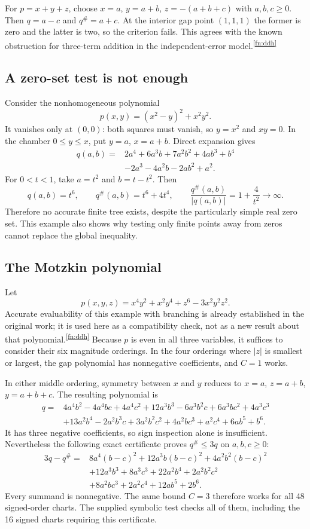 \documentclass[11pt,a4paper]{article}
\theoremstyle{definition}
\theoremstyle{remark}
\newcommand{\abs}[1]{\lvert #1\rvert}
\newcommand{\maj}[1]{#1^{\#}}
\newcommand{\src}[1]{\textsuperscript{\ref{fn:#1}}}
\begin{document}
For $p=x+y+z$, choose $x=a$, $y=a+b$, $z=-(a+b+c)$ with $a,b,c\ge0$.
Then $q=a-c$ and $\maj q=a+c$. At the interior gap point $(1,1,1)$ the former
is zero and the latter is two, so the criterion fails. This agrees with the
known obstruction for three-term addition in the independent-error
model.\src{ddh}

\subsection{A zero-set test is not enough}

Consider the nonhomogeneous polynomial
\[
 p(x,y)=(x^2-y)^2+x^2y^2.
\]
It vanishes only at $(0,0)$: both squares must vanish, so $y=x^2$ and $xy=0$.
In the chamber $0\le y\le x$, put $y=a$, $x=a+b$. Direct expansion gives
\begin{align*}
 q(a,b)={}&2a^4+6a^3b+7a^2b^2+4ab^3+b^4\\
          &-2a^3-4a^2b-2ab^2+a^2.
\end{align*}
For $0<t<1$, take $a=t^2$ and $b=t-t^2$. Then
\[
 q(a,b)=t^6,\qquad \maj q(a,b)=t^6+4t^4,
 \qquad\frac{\maj q(a,b)}{\abs{q(a,b)}}=1+\frac4{t^2}\longrightarrow\infty.
\]
Therefore no accurate finite tree exists, despite the particularly simple
real zero set. This example also shows why testing only finite points away
from zeros cannot replace the global inequality.

\subsection{The Motzkin polynomial}

Let
\[
 p(x,y,z)=x^4y^2+x^2y^4+z^6-3x^2y^2z^2.
\]
Accurate evaluability of this example with branching is already established
in the original work; it is used here as a compatibility check, not as a new
result about that polynomial.\src{ddh}
Because $p$ is even in all three variables, it suffices to consider their six
magnitude orderings. In the four orderings where $|z|$ is smallest or largest,
the gap polynomial has nonnegative coefficients, and $C=1$ works.

In either middle ordering, symmetry between $x$ and $y$ reduces to
$x=a$, $z=a+b$, $y=a+b+c$. The resulting polynomial is
\begin{align*}
 q={}&4a^4b^2-4a^4bc+4a^4c^2
       +12a^3b^3-6a^3b^2c+6a^3bc^2+4a^3c^3\\
     &+13a^2b^4-2a^2b^3c+3a^2b^2c^2+4a^2bc^3+a^2c^4
       +6ab^5+b^6.
\end{align*}
It has three negative coefficients, so sign inspection alone is insufficient.
Nevertheless the following exact certificate proves $\maj q\le3q$ on
$a,b,c\ge0$:
\begin{align*}
 3q-\maj q={}&8a^4(b-c)^2+12a^3b(b-c)^2+4a^2b^2(b-c)^2\\
 &+12a^3b^3+8a^3c^3+22a^2b^4+2a^2b^2c^2\\
 &+8a^2bc^3+2a^2c^4+12ab^5+2b^6.
\end{align*}
Every summand is nonnegative. The same bound $C=3$ therefore works for all
48 signed-order charts. The supplied symbolic test checks all of them,
including the 16 signed charts requiring this certificate.
\end{document}
